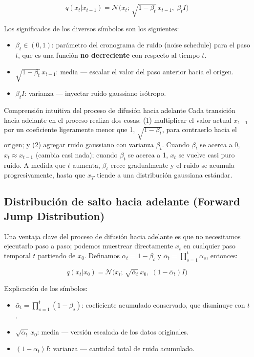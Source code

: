 \documentclass[a4paper]{article}
\begin{document}
$$q(x_t | x_{t-1}) = \mathcal{N}\big(x_t;\, \sqrt{1 - \beta_t}\, x_{t-1},\; \beta_t I\big)$$

Los significados de los diversos símbolos son los siguientes:
\begin{itemize}
    \item $\beta_t \in (0, 1)$: parámetro del cronograma de ruido (noise schedule) para el paso $t$, que es una función \textbf{no decreciente} con respecto al tiempo $t$.
    \item $\sqrt{1 - \beta_t}\, x_{t-1}$: media — escalar el valor del paso anterior hacia el origen.
    \item $\beta_t I$: varianza — inyectar ruido gaussiano isótropo.
\end{itemize}

\begin{importantbox}{Comprensión intuitiva del proceso de difusión hacia adelante}
Cada transición hacia adelante en el proceso realiza dos cosas: (1) multiplicar el valor actual $x_{t-1}$ por un coeficiente ligeramente menor que 1, $\sqrt{1-\beta_t}$, para contraerlo hacia el origen; y (2) agregar ruido gaussiano con varianza $\beta_t$. Cuando $\beta_t$ se acerca a 0, $x_t \approx x_{t-1}$ (cambia casi nada); cuando $\beta_t$ se acerca a 1, $x_t$ se vuelve casi puro ruido. A medida que $t$ aumenta, $\beta_t$ crece gradualmente y el ruido se acumula progresivamente, hasta que $x_T$ tiende a una distribución gaussiana estándar.
\end{importantbox}

\subsection{Distribución de salto hacia adelante (Forward Jump Distribution)}

Una ventaja clave del proceso de difusión hacia adelante es que no necesitamos ejecutarlo paso a paso; podemos muestrear directamente $x_t$ en cualquier paso temporal $t$ partiendo de $x_0$. Definamos $\alpha_t = 1 - \beta_t$ y $\bar{\alpha}_t = \prod_{s=1}^{t} \alpha_s$, entonces:

$$q(x_t | x_0) = \mathcal{N}\big(x_t;\, \sqrt{\bar{\alpha}_t}\, x_0,\; (1 - \bar{\alpha}_t) I\big)$$

Explicación de los símbolos:
\begin{itemize}
    \item $\bar{\alpha}_t = \prod_{s=1}^{t}(1-\beta_s)$: coeficiente acumulado conservado, que disminuye con $t$.
    \item $\sqrt{\bar{\alpha}_t}\, x_0$: media — versión escalada de los datos originales.
    \item $(1 - \bar{\alpha}_t) I$: varianza — cantidad total de ruido acumulado.
\end{itemize}
\end{document}
